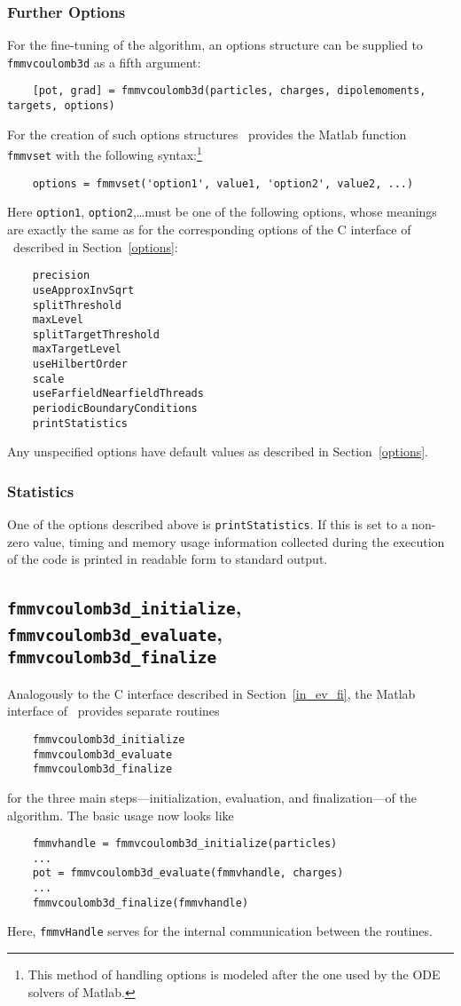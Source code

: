 \subsubsection*{Further Options}
For the fine-tuning of the algorithm, an options structure can be supplied
to \verb|fmmvcoulomb3d| as a fifth argument:
\begin{verbatim}
    [pot, grad] = fmmvcoulomb3d(particles, charges, dipolemoments, targets, options)
\end{verbatim}
For the creation of such options structures \fmmv\ provides
the {\sc Matlab} function \verb|fmmvset| with the following syntax:\footnote{This
method of handling options is modeled after the one used by the ODE solvers of
{\sc Matlab}.}
\begin{verbatim}
    options = fmmvset('option1', value1, 'option2', value2, ...)
\end{verbatim}
Here \verb|option1|, \verb|option2|,\dots must be one of the following options,
whose meanings are exactly the same as for the corresponding options of
the C interface of \fmmv\ described in Section~\ref{options}:
\begin{verbatim}
    precision
    useApproxInvSqrt
    splitThreshold
    maxLevel
    splitTargetThreshold
    maxTargetLevel
    useHilbertOrder
    scale
    useFarfieldNearfieldThreads
    periodicBoundaryConditions
    printStatistics
\end{verbatim}
Any unspecified options have default values as described in Section~\ref{options}.
\subsubsection*{Statistics}
One of the options described above is \verb|printStatistics|. If this is set
to a non-zero value, timing and memory usage information collected during
the execution of the code is printed in readable form to standard output.
\subsection{{\tt fmmvcoulomb3d\_initialize}, 
{\tt fmmvcoulomb3d\_evaluate},\\
{\tt fmmvcoulomb3d\_finalize}}
Analogously to the C interface described in Section~\ref{in_ev_fi},
the {\sc Matlab} interface of  \fmmv\ provides separate routines
\begin{verbatim}
    fmmvcoulomb3d_initialize
    fmmvcoulomb3d_evaluate
    fmmvcoulomb3d_finalize
\end{verbatim}
for the three main steps---initialization, evaluation, and finalization---of 
the algorithm.  
The basic usage now looks like
\begin{verbatim}
    fmmvhandle = fmmvcoulomb3d_initialize(particles)
    ...
    pot = fmmvcoulomb3d_evaluate(fmmvhandle, charges)
    ...
    fmmvcoulomb3d_finalize(fmmvhandle)
\end{verbatim}
Here, \verb|fmmvHandle| serves for the internal communication 
between the routines.
